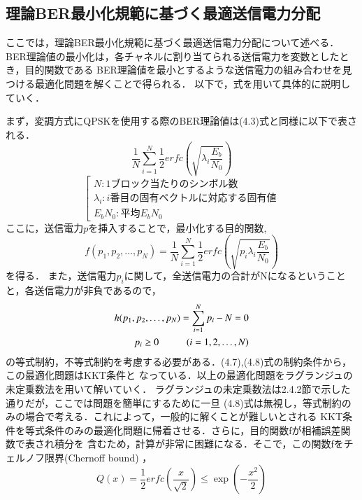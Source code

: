 \subsection{理論BER最小化規範に基づく最適送信電力分配}
ここでは，理論BER最小化規範に基づく最適送信電力分配について述べる．
BER理論値の最小化は，各チャネルに割り当てられる送信電力を変数としたとき，目的関数である
BER理論値を最小とするような送信電力の組み合わせを見つける最適化問題を解くことで得られる．
以下で，式を用いて具体的に説明していく．

まず，変調方式にQPSKを使用する際のBER理論値は(4.3)式と同様に以下で表される．
\begin{equation}
    \frac{1}{N} \sum_{i=1}^N \frac{1}{2}erfc\left( \sqrt{\lambda_i\frac{E_b}{N_0}} \right)
\end{equation}
\begin{equation}
    \left[
        \begin{array}{l}
            N:1ブロック当たりのシンボル数 \\
            \lambda_i:i番目の固有ベクトルに対応する固有値 \\
            E_bN_0:平均E_bN_0
        \end{array}
    \right. \nonumber
\end{equation}
ここに，送信電力$p$を挿入することで，最小化する目的関数,
\begin{equation}
    f(p_1,p_2,\ldots,p_N) = \frac{1}{N} \sum_{i=1}^N \frac{1}{2}erfc\left( \sqrt{p_i\lambda_i\frac{E_b}{N_0}} \right)
\end{equation}
を得る．
また，送信電力$p_i$に関して，全送信電力の合計がNになるということと，各送信電力が非負であるので，
\begin{eqnarray}
    h(p_1,p_2,\ldots,p_N) = \sum_{i=1}^N p_i-N=0 \\
    p_i \geq 0 \hspace{10mm} (i=1,2,\ldots,N)
\end{eqnarray}
の等式制約，不等式制約を考慮する必要がある．(4.7),(4.8)式の制約条件から，この最適化問題はKKT条件と
なっている．以上の最適化問題をラグランジュの未定乗数法を用いて解いていく．
ラグランジュの未定乗数法は2.4.2節で示した通りだが，ここでは問題を簡単にするために一旦
(4.8)式は無視し，等式制約のみの場合で考える．これによって，一般的に解くことが難しいとされる
KKT条件を等式条件のみの最適化問題に帰着させる．さらに，目的関数fが相補誤差関数で表され積分を
含むため，計算が非常に困難になる．そこで，この関数fをチェルノフ限界(Chernoff bound) \cite{akaiwa}，
\begin{equation}
    Q(x) = \frac{1}{2}erfc\left( \frac{x}{\sqrt{2}} \right) \leq \exp\left( -\frac{x^2}{2} \right)
\end{equation}
